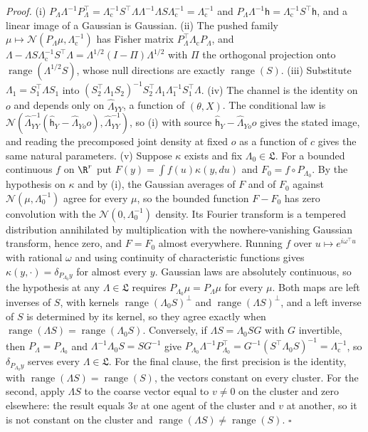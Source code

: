 \noindent\emph{Proof.}
(i) \(P_\Lambda\Lambda^{-1}P_\Lambda^\top
=\Lambda_{\mathrm c}^{-1}S^\top\Lambda\Lambda^{-1}\Lambda S\Lambda_{\mathrm c}^{-1}
=\Lambda_{\mathrm c}^{-1}\) and
\(P_\Lambda\Lambda^{-1}\mathsf h=\Lambda_{\mathrm c}^{-1}S^\top\mathsf h\), and a
linear image of a Gaussian is Gaussian. (ii) The pushed family
\(\mu\mapsto\mathcal N(P_\Lambda\mu,\Lambda_{\mathrm c}^{-1})\) has Fisher matrix
\(P_\Lambda^\top\Lambda_{\mathrm c}P_\Lambda\), and
\(\Lambda-\Lambda S\Lambda_{\mathrm c}^{-1}S^\top\Lambda
=\Lambda^{1/2}(I-\Pi)\Lambda^{1/2}\) with \(\Pi\) the orthogonal projection onto
\(\operatorname{range}(\Lambda^{1/2}S)\), whose null directions are exactly
\(\operatorname{range}(S)\). (iii) Substitute \(\Lambda_1=S_1^\top\Lambda S_1\)
into \((S_2^\top\Lambda_1S_2)^{-1}S_2^\top\Lambda_1\Lambda_1^{-1}S_1^\top\Lambda\).
(iv) The channel is the identity on \(o\) and depends only on
\(\widehat\Lambda_{YY}\), a function of \((\theta,X)\). The conditional law is
\(\mathcal N(\widehat\Lambda_{YY}^{-1}(\widehat{\mathsf h}_Y-\widehat\Lambda_{Yo}o),\widehat\Lambda_{YY}^{-1})\),
so (i) with source \(\widehat{\mathsf h}_Y-\widehat\Lambda_{Yo}o\) gives the stated image, and
reading the precomposed joint density at fixed \(o\) as a function of \(c\) gives
the same natural parameters. (v) Suppose \(\kappa\) exists and fix
\(\Lambda_0\in\mathfrak L\). For a bounded continuous \(f\) on \(\R^r\) put
\(F(y)=\int f(u)\kappa(y,du)\) and \(F_0=f\circ P_{\Lambda_0}\). By the
hypothesis on \(\kappa\) and by (i), the Gaussian averages of \(F\) and of
\(F_0\) against \(\mathcal N(\mu,\Lambda_0^{-1})\) agree for every \(\mu\), so
the bounded function \(F-F_0\) has zero convolution with the
\(\mathcal N(0,\Lambda_0^{-1})\) density. Its Fourier transform is a tempered
distribution annihilated by multiplication with the nowhere-vanishing Gaussian
transform, hence zero, and \(F=F_0\) almost everywhere. Running \(f\) over
\(u\mapsto e^{i\omega^\top u}\) with rational \(\omega\) and using continuity of
characteristic functions gives \(\kappa(y,\cdot)=\delta_{P_{\Lambda_0}y}\) for
almost every \(y\). Gaussian laws are absolutely continuous, so the hypothesis
at any \(\Lambda\in\mathfrak L\) requires \(P_{\Lambda_0}\mu=P_\Lambda\mu\) for
every \(\mu\). Both maps are left inverses of \(S\), with kernels
\(\operatorname{range}(\Lambda_0S)^\perp\) and
\(\operatorname{range}(\Lambda S)^\perp\), and a left inverse of \(S\) is
determined by its kernel, so they agree exactly when
\(\operatorname{range}(\Lambda S)=\operatorname{range}(\Lambda_0S)\). Conversely,
if \(\Lambda S=\Lambda_0SG\) with \(G\) invertible, then
\(P_\Lambda=P_{\Lambda_0}\) and \(\Lambda^{-1}\Lambda_0S=SG^{-1}\) give
\(P_{\Lambda_0}\Lambda^{-1}P_{\Lambda_0}^\top=G^{-1}(S^\top\Lambda_0S)^{-1}
=\Lambda_{\mathrm c}^{-1}\), so \(\delta_{P_{\Lambda_0}y}\) serves every
\(\Lambda\in\mathfrak L\). For the final clause, the first precision is the
identity, with \(\operatorname{range}(\Lambda S)=\operatorname{range}(S)\), the
vectors constant on every cluster. For the second, apply \(\Lambda S\) to the
coarse vector equal to \(v\neq0\) on the cluster and zero elsewhere: the result
equals \(3v\) at one agent of the cluster and \(v\) at another, so it is not
constant on the cluster and \(\operatorname{range}(\Lambda S)\neq
\operatorname{range}(S)\). \(\square\)

